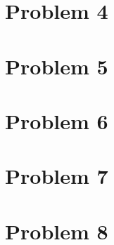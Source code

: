 \documentclass[12pt]{article}
\begin{document}
\section*{Problem 4}

\section*{Problem 5}

\section*{Problem 6}

\section*{Problem 7}

\section*{Problem 8}
\end{document}
